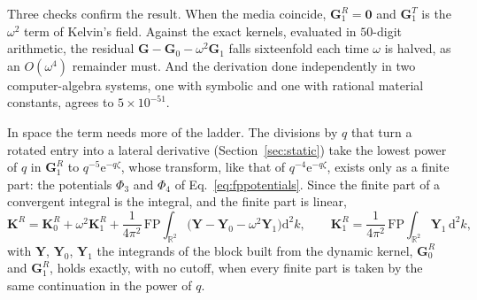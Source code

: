 \documentclass[11pt,a4paper]{article}
\newcommand{\bK}{\mathbf{K}}
\newcommand{\dd}{\mathrm{d}}
\newcommand{\ee}{\mathrm{e}}
\begin{document}
Three checks confirm the result. When the media coincide, $\mathbf G^{R}_1=\mathbf 0$ and
$\mathbf G^{T}_1$ is the $\omega^2$ term of Kelvin's field. Against the exact kernels, evaluated in $50$-digit
arithmetic, the residual $\mathbf G-\mathbf G_0-\omega^2\mathbf G_1$ falls sixteenfold each time $\omega$ is
halved, as an $O(\omega^4)$ remainder must. And the derivation done independently in two computer-algebra
systems, one with symbolic and one with rational material constants, agrees to $5\times10^{-51}$.

In space the term needs more of the ladder. The divisions by $q$ that turn a rotated entry into a lateral
derivative (Section~\ref{sec:static}) take the lowest power of $q$ in $\mathbf G^{R}_1$ to
$q^{-5}\ee^{-q\zeta}$, whose transform, like that of $q^{-4}\ee^{-q\zeta}$, exists only as a finite part: the
potentials $\Phi_3$ and $\Phi_4$ of Eq.~\eqref{eq:fppotentials}. Since the finite part of a convergent integral
is the integral, and the finite part is linear,
\begin{equation}\label{eq:fpsplit}
  \bK^R=\bK^R_0+\omega^2\bK^R_1+\frac{1}{4\pi^2}\,\mathrm{FP}\!\int_{\mathbb R^2}
  \bigl(\mathbf Y-\mathbf Y_0-\omega^2\mathbf Y_1\bigr)\dd^2k,\qquad
  \bK^R_1=\frac{1}{4\pi^2}\,\mathrm{FP}\!\int_{\mathbb R^2}\mathbf Y_1\,\dd^2k,
\end{equation}
with $\mathbf Y$, $\mathbf Y_0$, $\mathbf Y_1$ the integrands of the block built from the dynamic kernel,
$\mathbf G^R_0$ and $\mathbf G^R_1$, holds exactly, with no cutoff, when every finite part is taken by the
same continuation in the power of $q$.
\end{document}
